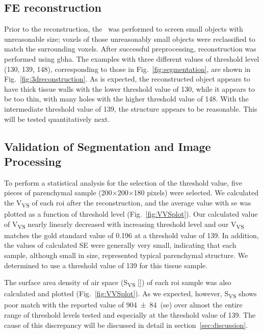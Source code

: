 \subsection{FE \threed reconstruction}
Prior to the \threed reconstruction, the \ was performed to screen small objects with unreasonable size; voxels of those unreasonably small objects were reclassified to match the surrounding voxels. After successful preprocessing, \threed reconstruction was performed using \ac{gbha}. The examples with three different values of threshold level (130, 139, 148), corresponding to those in Fig.~\ref{fig:segmentation}, are shown in Fig.~\ref{fig:3dreconstruction}. As is expected, the \threed reconstructed object appears to have thick tissue walls with the lower threshold value of 130, while it appears to be too thin, with many holes with the higher threshold value of 148. With the intermediate threshold value of 139, the structure appears to be reasonable. This will be tested quantitatively next.

\subsection{Validation of Segmentation and Image Processing}
To perform a statistical analysis for the selection of the threshold value, five pieces of parenchymal sample (200$\times$200$\times$180 pixels) were selected. We calculated the V\textsubscript{VS} of each \ac{roi} after the \threed reconstruction, and the average value with \ac{se} was plotted as a function of threshold level (Fig.~\ref{fig:VVSplot}). Our calculated value of V\textsubscript{VS} nearly linearly decreased with increasing threshold level and our V\textsubscript{VS} matches the gold standard value of 0.196 at a threshold value of 139. In addition, the values of calculated SE were generally very small, indicating that each sample, although small in size, represented typical parenchymal structure. We determined to use a threshold value of 139 for this tissue sample.

The surface area density of air space (S\textsubscript{VS} [\centimetresquared\per\centimetrecubed]) of each \ac{roi} sample was also calculated and plotted (Fig.~\ref{fig:VVSplot}). As we expected, however, S\textsubscript{VS} shows poor match with the reported value of \num[seperr]{904(84)}~(\acs{se}) over almost the entire range of threshold levels tested and especially at the threshold value of 139. The cause of this discrepancy will be discussed in detail in section~\ref{sec:discussion}.

